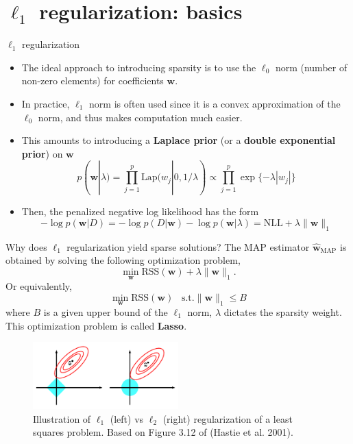 \documentclass[10pt,mathserif]{beamer}
\begin{document}
\section{$\ell_1$ regularization: basics}

\begin{frame}{$\ell_1$ regularization}
\begin{itemize}
    \item The ideal approach to introducing sparsity is to use the $\ell_0$ norm (number of non-zero elements) for coefficients $\bm{w}$.
    \item In practice, $\ell_1$ norm is often used since
    it is a convex approximation of the $\ell_0$ norm, and thus makes computation much easier. 
    \item This amounts to introducing a \textbf{Laplace prior} (or a \textbf{double exponential prior}) on $\bm{w}$
    \begin{equation*}
    p(\bm{w}|\lambda)= \prod_{j=1}^p\text{Lap}(w_j|0,1/\lambda)\propto\prod_{j=1}^p \exp\{-\lambda|w_j|\}
    \end{equation*}
    \item Then, the penalized negative log likelihood has the form
    \begin{equation*}
    -\log p(\bm{w}|D) = - \log p(D|\bm{w}) - \log p(\bm{w}|\lambda) =  \text{NLL} + \lambda\|\bm{w}\|_1
    \end{equation*}
\end{itemize}
\end{frame}

\begin{frame}{Why does $\ell_1$ regularization yield sparse solutions?}
The MAP estimator $\hat{\bm{w}}_{\text{MAP}}$ is obtained by solving the following optimization problem,
    \begin{equation*}
        \min_{\bm{w}} \text{RSS}(\bm{w}) + \lambda\|\bm{w}\|_1.
    \end{equation*}   
Or equivalently,
    \begin{equation*}
        \min_{\bm{w}} \text{RSS}(\bm{w}) \;\;\;\text{s.t.} \|\bm{w}\|_1\leq B
    \end{equation*}
where $B$ is a given upper bound of the $\ell_1$ norm, $\lambda$ dictates the sparsity weight. This optimization problem is called \textbf{Lasso}.
\begin{figure}[h]
\centering
\includegraphics[width=0.5\textwidth]{L2L1contours}
\caption{Illustration of $\ell_1$ (left) vs $\ell_2$ (right) regularization of a least squares problem. Based on Figure 3.12 of (Hastie et al. 2001).}
\end{figure}    
\end{frame}
\end{document}
